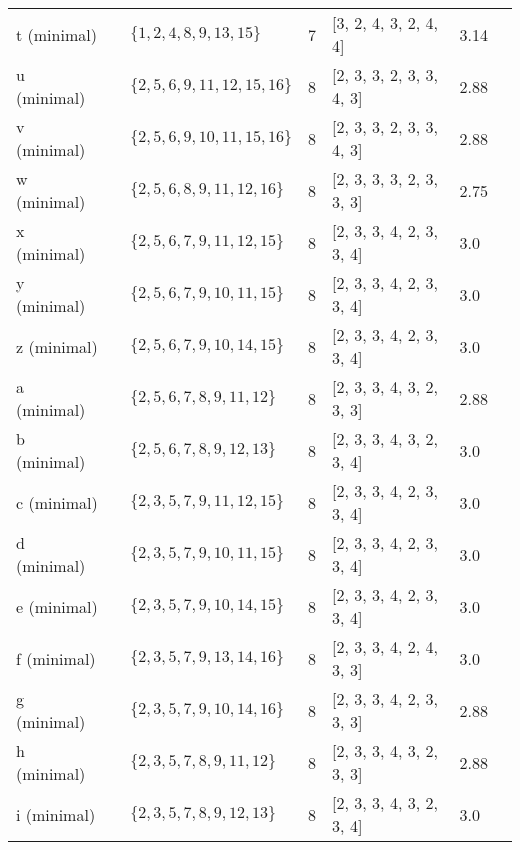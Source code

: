 \documentclass{article}%
\begin{document}
\begin{table}[ht]
\begin{tabularx}{\textwidth}{lXXXXXX}
			t (minimal) & {\Huge\textcolor{green45}{\textbullet}} & $\{1,2,4,8,9,13,15\}$ & 7 & [3, 2, 4, 3, 2, 4, 4] & 3.14 \\
			u (minimal) & {\Huge\textcolor{green46}{\textbullet}} & $\{2,5,6,9,11,12,15,16\}$ & 8 & [2, 3, 3, 2, 3, 3, 4, 3] & 2.88 \\
			v (minimal) & {\Huge\textcolor{green47}{\textbullet}} & $\{2,5,6,9,10,11,15,16\}$ & 8 & [2, 3, 3, 2, 3, 3, 4, 3] & 2.88 \\
			w (minimal) & {\Huge\textcolor{green48}{\textbullet}} & $\{2,5,6,8,9,11,12,16\}$ & 8 & [2, 3, 3, 3, 2, 3, 3, 3] & 2.75 \\
			x (minimal) & {\Huge\textcolor{green49}{\textbullet}} & $\{2,5,6,7,9,11,12,15\}$ & 8 & [2, 3, 3, 4, 2, 3, 3, 4] & 3.0 \\
			y (minimal) & {\Huge\textcolor{green50}{\textbullet}} & $\{2,5,6,7,9,10,11,15\}$ & 8 & [2, 3, 3, 4, 2, 3, 3, 4] & 3.0 \\
			z (minimal) & {\Huge\textcolor{green51}{\textbullet}} & $\{2,5,6,7,9,10,14,15\}$ & 8 & [2, 3, 3, 4, 2, 3, 3, 4] & 3.0 \\
			a (minimal) & {\Huge\textcolor{green52}{\textbullet}} & $\{2,5,6,7,8,9,11,12\}$ & 8 & [2, 3, 3, 4, 3, 2, 3, 3] & 2.88 \\
			b (minimal) & {\Huge\textcolor{green53}{\textbullet}} & $\{2,5,6,7,8,9,12,13\}$ & 8 & [2, 3, 3, 4, 3, 2, 3, 4] & 3.0 \\
			c (minimal) & {\Huge\textcolor{green54}{\textbullet}} & $\{2,3,5,7,9,11,12,15\}$ & 8 & [2, 3, 3, 4, 2, 3, 3, 4] & 3.0 \\
			d (minimal) & {\Huge\textcolor{green55}{\textbullet}} & $\{2,3,5,7,9,10,11,15\}$ & 8 & [2, 3, 3, 4, 2, 3, 3, 4] & 3.0 \\
			e (minimal) & {\Huge\textcolor{green56}{\textbullet}} & $\{2,3,5,7,9,10,14,15\}$ & 8 & [2, 3, 3, 4, 2, 3, 3, 4] & 3.0 \\
			f (minimal) & {\Huge\textcolor{green57}{\textbullet}} & $\{2,3,5,7,9,13,14,16\}$ & 8 & [2, 3, 3, 4, 2, 4, 3, 3] & 3.0 \\
			g (minimal) & {\Huge\textcolor{green58}{\textbullet}} & $\{2,3,5,7,9,10,14,16\}$ & 8 & [2, 3, 3, 4, 2, 3, 3, 3] & 2.88 \\
			h (minimal) & {\Huge\textcolor{green59}{\textbullet}} & $\{2,3,5,7,8,9,11,12\}$ & 8 & [2, 3, 3, 4, 3, 2, 3, 3] & 2.88 \\
			i (minimal) & {\Huge\textcolor{green60}{\textbullet}} & $\{2,3,5,7,8,9,12,13\}$ & 8 & [2, 3, 3, 4, 3, 2, 3, 4] & 3.0 \\

\end{tabularx}
\end{table}
\end{document}
